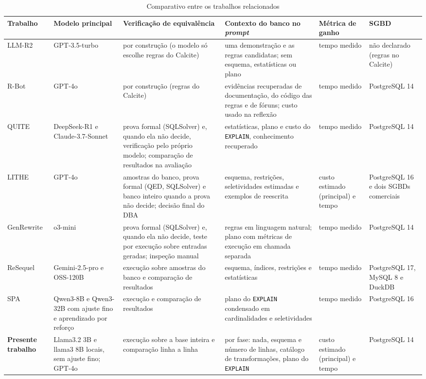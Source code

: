 \documentclass[12pt]{article}
\begin{document}
\begin{landscape}
\begin{table}[!htb]
\centering
\caption{Comparativo entre os trabalhos relacionados}
\label{tab:relacionados}
\footnotesize\setlength{\tabcolsep}{2pt}
\begin{tabular}{p{1.75cm}p{2.8cm}p{4.2cm}p{4.5cm}p{2.8cm}p{2.6cm}}
\hline
\textbf{Trabalho} & \textbf{Modelo principal} & \textbf{Verificação de equivalência} & \textbf{Contexto do banco no \textit{prompt}} & \textbf{Métrica de ganho} & \textbf{SGBD} \\
\hline
LLM-R2 & GPT-3.5-turbo & por construção (o modelo só escolhe regras do Calcite) & uma demonstração e as regras candidatas; sem esquema, estatísticas ou plano & tempo medido & não declarado (regras no Calcite) \\
R-Bot & GPT-4o & por construção (regras do Calcite) & evidências recuperadas de documentação, do código das regras e de fóruns; custo usado na reflexão & tempo medido & PostgreSQL 14 \\
QUITE & DeepSeek-R1 e Claude-3.7-Sonnet & prova formal (SQLSolver) e, quando ela não decide, verificação pelo próprio modelo; comparação de resultados na avaliação & estatísticas, plano e custo do \texttt{EXPLAIN}, conhecimento recuperado & tempo medido & PostgreSQL 14 \\
LITHE & GPT-4o & amostras do banco, prova formal (QED, SQLSolver) e banco inteiro quando a prova não decide; decisão final do DBA & esquema, restrições, seletividades estimadas e exemplos de reescrita & custo estimado (principal) e tempo & PostgreSQL 16 e dois SGBDs comerciais \\
GenRewrite & o3-mini & prova formal (SQLSolver) e, quando ela não decide, teste por execução sobre entradas geradas; inspeção manual & regras em linguagem natural; plano com métricas de execução em chamada separada & tempo medido & PostgreSQL 14 \\
ReSequel & Gemini-2.5-pro e OSS-120B & execução sobre amostras do banco e comparação de resultados & esquema, índices, restrições e estatísticas & tempo medido & PostgreSQL 17, MySQL 8 e DuckDB \\
SPA & Qwen3-8B e Qwen3-32B com ajuste fino e aprendizado por reforço & execução e comparação de resultados & plano do \texttt{EXPLAIN} condensado em cardinalidades e seletividades & tempo medido & PostgreSQL 16 \\
\textbf{Presente trabalho} & Llama3.2 3B e llama3 8B locais, sem ajuste fino; GPT-4o & execução sobre a base inteira e comparação linha a linha & por fase: nada, esquema e número de linhas, catálogo de transformações, plano do \texttt{EXPLAIN} & custo estimado (principal) e tempo & PostgreSQL 14 \\
\hline
\end{tabular}
\end{table}
\end{landscape}
\end{document}

